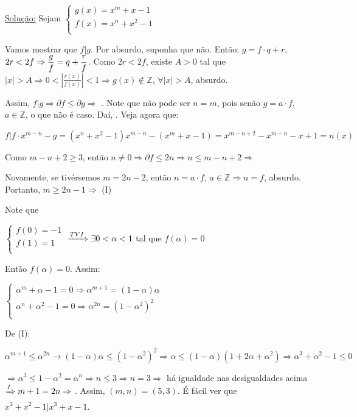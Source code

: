 \documentclass[a4paper,12pt]{article}
\renewcommand{\leq}{\ensuremath{\leqslant}}
\renewcommand{\geq}{\ensuremath{\geqslant}}
\newcommand*{\hm}[1]{#1\nobreak\discretionary{}
	{\hbox{$\mathsurround=0pt #1$}}{}}
\theoremstyle{plain} %
\theoremstyle{definition} %
\theoremstyle{remark} %
\begin{document}
	\begin{framed}
		\underline{Solu\c{c}\~ao:} Sejam $\left\{
		\begin{array}{lc}
			g(x)=x^m+x-1\\
			f(x)=x^n+x^2-1\\
		\end{array}
		\right.$
		
		Vamos mostrar que $f|g$. Por absurdo, suponha que n\~ao. Ent\~ao: $g=f\cdot q+r$, $2r<2f\Rightarrow\displaystyle\frac{g}{f}\hm{=}q+\frac{r}{f}$. Como $2r<2f$, existe $A>0$ tal que $|x|>A\Rightarrow 0<\left|\displaystyle\frac{r(x)}{f(x)}\right|<1\Rightarrow g(x)\not\in\mathds{Z}$, $\forall |x|>A$, absurdo.
		
		Assim, $f|g\Rightarrow \partial f\leq \partial g\Rightarrow$ \fbox{$n\leq m$}. Note que n\~ao pode ser $n=m$, pois sen\~ao $g=a\cdot f$, $a\in\mathds{Z}$, o que n\~ao \'e caso. Da\'i, \fbox{$m\geq n+1$}. Veja agora que:
		
		$f|f\cdot x^{m-n}-g=(x^n+x^2-1)x^{m-n}-(x^m+x-1)=x^{m-n+2}-x^{m-n}-x+1=n(x)$
		
		Como $m-n+2\geq 3$, ent\~ao $n\neq 0\Rightarrow \partial f\leq 2n\Rightarrow n\leq m-n+2\Rightarrow$ \fbox{$m\geq 2n-2$}
		
		Novamente, se tiv\'ersemos $m=2n-2$, ent\~ao $n=a\cdot f$, $a\in\mathds{Z}\Rightarrow n=f$, absurdo. Portanto, $m\geq 2n-1\Rightarrow$ \fbox{$m+1\geq 2n$} (I)
		
		Note que
		
		\vspace{1em}
		
		$\left\{
		\begin{array}{lc}
			f(0)=-1\\
			f(1)=1\\
		\end{array}
		\right.$ $\xRightarrow{TVI} \exists 0<\alpha<1$ tal que $f(\alpha)=0$
		
		\vspace{1em}
		
		Ent\~ao $f(\alpha)=0$. Assim:
		
		\vspace{1em}
		
		$\left\{
		\begin{array}{lc}
			\alpha^m+\alpha-1=0\Rightarrow \alpha^{m+1}=(1-\alpha)\alpha\\
			\alpha^n+\alpha^2-1=0\Rightarrow \alpha^{2n}=(1-\alpha^2)^2\\
		\end{array}
		\right.$
		\vspace{1em}
		
		De (I):
		
		$\alpha^{m+1}\leq \alpha^{2n}\rightarrow(1-\alpha)\alpha\leq(1-\alpha^2)^2\Rightarrow\alpha\leq(1-\alpha)(1+2\alpha+\alpha^2)\Rightarrow\alpha^3+\alpha^2-1\leq 0$
		
		$\Rightarrow\alpha^3\leq 1-\alpha^2=\alpha^n\Rightarrow n\leq 3\Rightarrow n=3\Rightarrow$ h\'a igualdade nas desigualdades acima $\xRightarrow{I}m+1\hm{=}2n\Rightarrow$ . Assim, $(m,n)=(5,3)$. \'E f\'acil ver que $x^3+x^2-1|x^3+x-1$. \tiny\textblock 
		
		\normalsize
	\end{framed}
	
\end{document}
